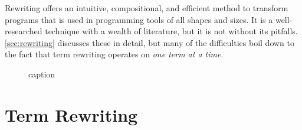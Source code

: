 Rewriting offers an
 intuitive, compositional, and efficient
 method to transform programs
 that is used in programming tools of all shapes and sizes.
It is a well-researched technique with a wealth of literature,
 but it is not without its pitfalls.
\autoref{sec:rewriting} discusses these in detail,
 but many of the difficulties boil down to the fact that
 term rewriting operates on \emph{one term at a time}.

\begin{figure}
  \centering

  \vspace{1cm}

  \vspace{1cm}

  \caption{
    caption
  }\label{fig:bad-rewrites}
\end{figure}


\section{Term Rewriting}
\label{sec:rewriting}


